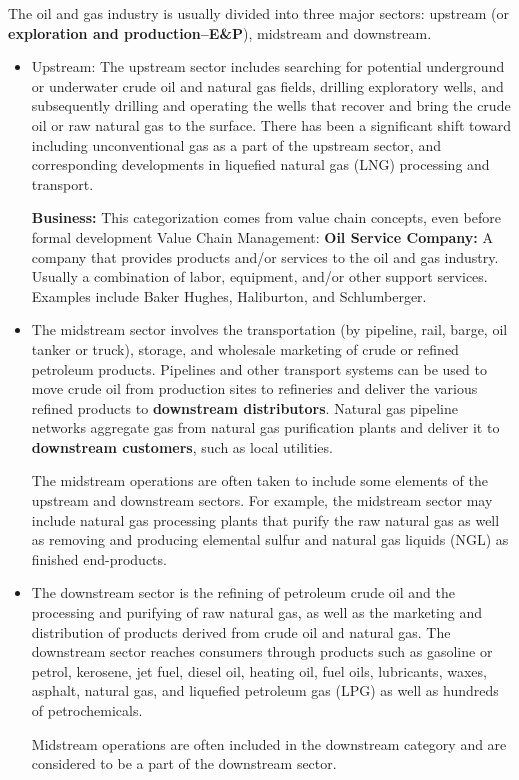 \documentclass[12pt,a4paper]{report}
\begin{document}
The oil and gas industry is usually divided into three major sectors:
upstream (or \textbf{exploration and production--E\&P}), midstream and
downstream.
\begin{itemize}[noitemsep,topsep=0pt]
\item Upstream: The upstream sector includes searching for potential
  underground or underwater crude oil and natural gas fields, drilling
  exploratory wells, and subsequently drilling and operating the wells that
  recover and bring the crude oil or raw natural gas to the surface.
  There has been a significant shift toward including unconventional gas as
  a part of the upstream sector, and corresponding developments in liquefied
  natural gas (LNG) processing and transport.

  \textbf{Business:} This categorization comes from value chain concepts,
  even before formal development Value Chain Management: \textbf{Oil Service
    Company:} A company that provides products and/or services to the oil
  and gas industry.  Usually a combination of labor, equipment, and/or other
  support services.  Examples include Baker Hughes, Haliburton, and
  Schlumberger.
\item The midstream sector involves the transportation (by pipeline, rail,
  barge, oil tanker or truck), storage, and wholesale marketing of crude or
  refined petroleum products. Pipelines and other transport systems can be
  used to move crude oil from production sites to refineries and deliver the
  various refined products to \textbf{downstream distributors}. Natural gas
  pipeline networks aggregate gas from natural gas purification plants and
  deliver it to \textbf{downstream customers}, such as local utilities.

  The midstream operations are often taken to include some elements of the
  upstream and downstream sectors. For example, the midstream sector may
  include natural gas processing plants that purify the raw natural gas as
  well as removing and producing elemental sulfur and natural gas liquids
  (NGL) as finished end-products.
\item The downstream sector is the refining of petroleum crude oil and the
  processing and purifying of raw natural gas, as well as the marketing
  and distribution of products derived from crude oil and natural gas. The
  downstream sector reaches consumers through products such as gasoline or
  petrol, kerosene, jet fuel, diesel oil, heating oil, fuel oils,
  lubricants, waxes, asphalt, natural gas, and liquefied petroleum gas (LPG)
  as well as hundreds of petrochemicals.

  Midstream operations are often included in the downstream category and are
  considered to be a part of the downstream sector.
\end{itemize}
\end{document}
